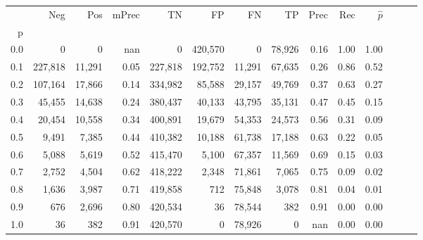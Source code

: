 \begin{tabular}{rrrrrrrrrrrrrr}
\toprule
{} &      Neg &     Pos & mPrec &       TN &       FP &      FN &      TP &  Prec &   Rec & $\hat{p}$ \\
p   &          &         &       &          &          &         &         &       &       &           \\
\midrule
0.0 &        0 &       0 &   nan &        0 &  420,570 &       0 &  78,926 &  0.16 &  1.00 &      1.00 \\
0.1 &  227,818 &  11,291 &  0.05 &  227,818 &  192,752 &  11,291 &  67,635 &  0.26 &  0.86 &      0.52 \\
0.2 &  107,164 &  17,866 &  0.14 &  334,982 &   85,588 &  29,157 &  49,769 &  0.37 &  0.63 &      0.27 \\
0.3 &   45,455 &  14,638 &  0.24 &  380,437 &   40,133 &  43,795 &  35,131 &  0.47 &  0.45 &      0.15 \\
0.4 &   20,454 &  10,558 &  0.34 &  400,891 &   19,679 &  54,353 &  24,573 &  0.56 &  0.31 &      0.09 \\
0.5 &    9,491 &   7,385 &  0.44 &  410,382 &   10,188 &  61,738 &  17,188 &  0.63 &  0.22 &      0.05 \\
0.6 &    5,088 &   5,619 &  0.52 &  415,470 &    5,100 &  67,357 &  11,569 &  0.69 &  0.15 &      0.03 \\
0.7 &    2,752 &   4,504 &  0.62 &  418,222 &    2,348 &  71,861 &   7,065 &  0.75 &  0.09 &      0.02 \\
0.8 &    1,636 &   3,987 &  0.71 &  419,858 &      712 &  75,848 &   3,078 &  0.81 &  0.04 &      0.01 \\
0.9 &      676 &   2,696 &  0.80 &  420,534 &       36 &  78,544 &     382 &  0.91 &  0.00 &      0.00 \\
1.0 &       36 &     382 &  0.91 &  420,570 &        0 &  78,926 &       0 &   nan &  0.00 &      0.00 \\
\bottomrule
\end{tabular}
